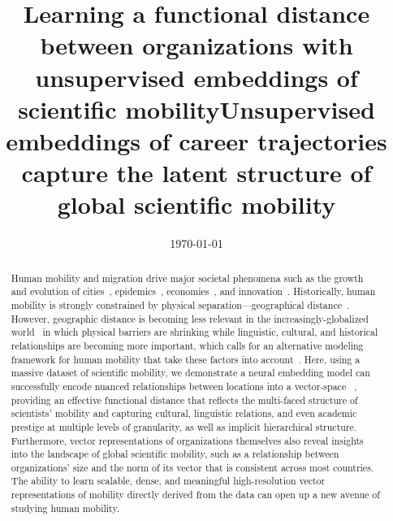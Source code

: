 \documentclass[12pt]{article} %
\begin{document}
\title{Learning a functional distance between organizations with unsupervised embeddings of scientific mobility}
\title{Unsupervised embeddings of career trajectories capture the latent structure of global scientific mobility} %
\date{\today}
\maketitle %

%
%

\begin{abstract}


Human mobility and migration drive major societal phenomena such as the growth and evolution of cities~\autocite{wef2017migration, curiel2018citygravity},  epidemics~\autocite{kraemer2020covid, truscott2012epidemicgravity, xia2005measlesgravity}, economies~\autocite{kaluza2010cargo, kerr2011immigration}, and innovation~\autocite{kaiser2018innovation, armano2017innovation, sugimoto2017mostimpact, petersen2018multiscale, franzoni2014advantage}.
Historically, human mobility is strongly constrained by physical separation---geographical distance~\autocite{zipf1946gravity}.
However, geographic distance is becoming less relevant in the increasingly-globalized world~\autocite{czaika2018migration, czaika2018globalisation, buchan2009globalization, altbach2004globalization} in which physical barriers are shrinking while linguistic, cultural, and historical relationships are becoming more important, which calls for an alternative modeling framework for human mobility that take these factors into account~\autocite{boschma2005proximity,  brown1970functional, brown1970migration, kim2018functional}.
Here, using a massive dataset of scientific mobility, we demonstrate a neural embedding model can successfully encode nuanced relationships between locations into a vector-space ~\autocite{mikolov2013word2vec}, providing an effective functional distance that reflects the multi-faced structure of scientists' mobility and capturing cultural, linguistic relations, and even academic prestige at multiple levels of granularity, as well as implicit hierarchical structure.
Furthermore, vector representations of organizations themselves also reveal insights into the landscape of global scientific mobility, such as a relationship between organizations' size and the norm of its vector that is consistent across most countries. 
The ability to learn scalable, dense, and meaningful high-resolution vector representations of mobility directly derived from the data can open up a new avenue of studying human mobility.


\end{abstract}
\end{document}

